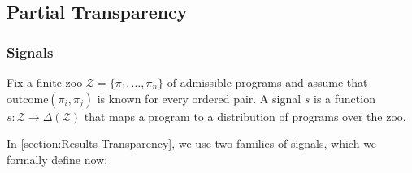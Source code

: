 \documentclass[twoside,11pt]{article}
\begin{document}


\subsection{Partial Transparency}
\subsubsection{Signals}
\label{apx-subsubsection:Theory-PartialTrans-Signals}
Fix a finite zoo $\mathcal{Z} = \{\pi_1, \ldots, \pi_n\}$ of admissible programs and assume that $\mathrm{outcome}(\pi_i,\pi_j)$ is known for every ordered pair. A signal $s$ is a function $s\colon \mathcal{Z} \to \Delta(\mathcal{Z})$ that maps a program to a distribution of programs over the zoo.

In \cref{section:Results-Transparency}, we use two families of signals, which we formally define now:
\end{document}
